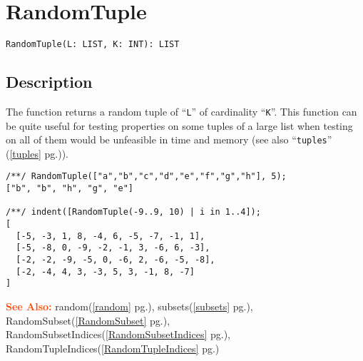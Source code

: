 \documentclass[a4paper]{mybook}
\newenvironment{command}{}{} %
\newcommand\SeeAlso{\par\textcolor{OrangeRed}{\textbf{\large See Also: }}}
\begin{document}
\section{RandomTuple}
\label{RandomTuple}
\begin{command} %


\begin{Verbatim}[label=syntax, rulecolor=\color{MidnightBlue},
frame=single]
RandomTuple(L: LIST, K: INT): LIST
\end{Verbatim}


\subsection*{Description}

The function returns a random tuple of ``\verb&L&'' of cardinality ``\verb&K&''.
This function can be quite useful for testing properties on some
tuples of a large list when testing on all of them would be
unfeasible in time and memory (see also ``\verb&tuples&'' (\ref{tuples} pg.\pageref{tuples})).
\begin{Verbatim}[label=example, rulecolor=\color{PineGreen}, frame=single]
/**/ RandomTuple(["a","b","c","d","e","f","g","h"], 5);
["b", "b", "h", "g", "e"]

/**/ indent([RandomTuple(-9..9, 10) | i in 1..4]);
[
  [-5, -3, 1, 8, -4, 6, -5, -7, -1, 1],
  [-5, -8, 0, -9, -2, -1, 3, -6, 6, -3],
  [-2, -2, -9, -5, 0, -6, 2, -6, -5, -8],
  [-2, -4, 4, 3, -3, 5, 3, -1, 8, -7]
]
\end{Verbatim}


\SeeAlso %
  random(\ref{random} pg.\pageref{random}), 
    subsets(\ref{subsets} pg.\pageref{subsets}), 
    RandomSubset(\ref{RandomSubset} pg.\pageref{RandomSubset}), 
    RandomSubsetIndices(\ref{RandomSubsetIndices} pg.\pageref{RandomSubsetIndices}), 
    RandomTupleIndices(\ref{RandomTupleIndices} pg.\pageref{RandomTupleIndices})
\end{command} %
\end{document}
